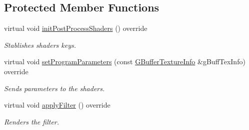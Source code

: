 \subsection*{Protected Member Functions}
\begin{DoxyCompactItemize}
\item 
\mbox{\label{class_geometry_engine_1_1_geometry_post_process_1_1_double_pass_post_process_1_1_blur_post_process_a12fac4df2ff487e6696c08641008a3a0}} 
virtual void \mbox{\hyperlink{class_geometry_engine_1_1_geometry_post_process_1_1_double_pass_post_process_1_1_blur_post_process_a12fac4df2ff487e6696c08641008a3a0}{init\+Post\+Process\+Shaders}} () override
\begin{DoxyCompactList}\small\item\em Stablishes shaders keys. \end{DoxyCompactList}\item 
\mbox{\label{class_geometry_engine_1_1_geometry_post_process_1_1_double_pass_post_process_1_1_blur_post_process_a280fb0972fb63b1d0f283604678a7404}} 
virtual void \mbox{\hyperlink{class_geometry_engine_1_1_geometry_post_process_1_1_double_pass_post_process_1_1_blur_post_process_a280fb0972fb63b1d0f283604678a7404}{set\+Program\+Parameters}} (const \mbox{\hyperlink{class_geometry_engine_1_1_g_buffer_texture_info}{G\+Buffer\+Texture\+Info}} \&g\+Buff\+Tex\+Info) override
\begin{DoxyCompactList}\small\item\em Sends parameters to the shaders. \end{DoxyCompactList}\item 
\mbox{\label{class_geometry_engine_1_1_geometry_post_process_1_1_double_pass_post_process_1_1_blur_post_process_a7d5a7ae52ec45c080b136c9afd13fc3c}} 
virtual void \mbox{\hyperlink{class_geometry_engine_1_1_geometry_post_process_1_1_double_pass_post_process_1_1_blur_post_process_a7d5a7ae52ec45c080b136c9afd13fc3c}{apply\+Filter}} () override
\begin{DoxyCompactList}\small\item\em Renders the filter. \end{DoxyCompactList}\item 

\end{DoxyCompactItemize}
